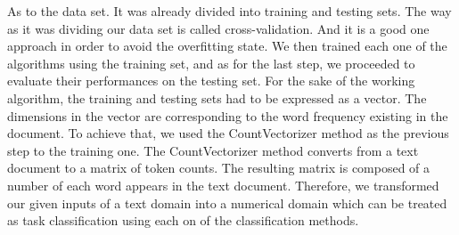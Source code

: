 \documentclass[journal]{IEEEtran}
\begin{document}
As to the data set. It was already divided into training and testing
sets. The way as it was dividing our data set is called cross-validation. And it is a good one approach in order to avoid the overfitting state. We then trained each one of the algorithms using the training set, and as for the last step, we proceeded to evaluate their performances on the testing set.
For the sake of the working algorithm, the training and testing sets had to be expressed as a vector. The dimensions in the vector are corresponding
to the word frequency existing in the document. To achieve that, we used the CountVectorizer method as the previous step to the training one. The CountVectorizer method converts from a text document to a matrix of token counts. The resulting matrix is composed of a number of each word appears in the text document. Therefore, we transformed our given inputs of a text domain into a numerical domain which can be treated as task classification using each on of the classification methods.
\end{document}
